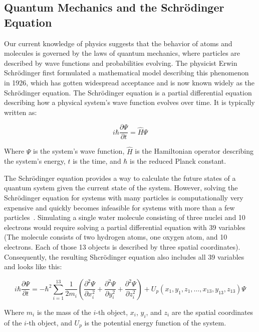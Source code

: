 \subsection{Quantum Mechanics and the Schrödinger Equation}

Our current knowledge of physics suggests that the behavior of atoms and molecules is governed by the laws of quantum mechanics, where particles are described by wave functions and probabilities evolving. The physicist Erwin Schrödinger first formulated a mathematical model describing this phenomenon in 1926, which has gotten widespread acceptance and is now known widely as the Schrödinger equation. The Schrödinger equation is a partial differential equation describing how a physical system's wave function evolves over time. It is typically written as:

\begin{equation}
      i \hbar \frac{\partial \Psi}{\partial t} = \hat{H} \Psi
\end{equation}

Where $\Psi$ is the system's wave function, $\hat{H}$ is the Hamiltonian operator describing the system's energy, $t$ is the time, and $\hbar$ is the reduced Planck constant.

The Schrödinger equation provides a way to calculate the future states of a quantum system given the current state of the system. However, solving the Schrödinger equation for systems with many particles is computationally very expensive and quickly becomes infeasible for systems with more than a few particles~\cite{Leimkuhler2015}. Simulating a single water molecule consisting of three nuclei and 10 electrons would require solving a partial differential equation with 39 variables (The molecule consists of two hydrogen atoms, one oxygen atom, and 10 electrons. Each of those 13 objects is described by three spatial coordinates). Consequently, the resulting Shcrödinger equation also includes all 39 variables and looks like this:

\begin{equation}
      i \hbar \frac{\partial \Psi}{\partial t} = -\hbar^2 \sum_{i=1}^{13} \frac{1}{2m_i} \left( \frac{\partial^2 \Psi}{\partial x_i^2} + \frac{\partial^2 \Psi}{\partial y_i^2} + \frac{\partial^2 \Psi}{\partial z_i^2} \right) + U_p (x_1, y_1, z_1, \ldots, x_{13}, y_{13}, z_{13}) \Psi
\end{equation}

Where $m_i$ is the mass of the $i$-th object, $x_i$, $y_i$, and $z_i$ are the spatial coordinates of the $i$-th object, and $U_p$ is the potential energy function of the system.

